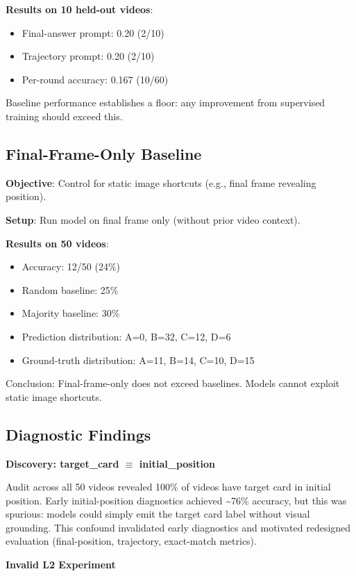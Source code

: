 \textbf{Results on 10 held-out videos}:
\begin{itemize}
    \item Final-answer prompt: 0.20 (2/10)
    \item Trajectory prompt: 0.20 (2/10)
    \item Per-round accuracy: 0.167 (10/60)
\end{itemize}

Baseline performance establishes a floor: any improvement from supervised training should exceed this.

\subsection{Final-Frame-Only Baseline}

\textbf{Objective}: Control for static image shortcuts (e.g., final frame revealing position).

\textbf{Setup}: Run model on final frame only (without prior video context).

\textbf{Results on 50 videos}:
\begin{itemize}
    \item Accuracy: 12/50 (24\%)
    \item Random baseline: 25\%
    \item Majority baseline: 30\%
    \item Prediction distribution: A=0, B=32, C=12, D=6
    \item Ground-truth distribution: A=11, B=14, C=10, D=15
\end{itemize}

Conclusion: Final-frame-only does not exceed baselines. Models cannot exploit static image shortcuts.

\subsection{Diagnostic Findings}

\textbf{Discovery: target\_card $\equiv$ initial\_position}

Audit across all 50 videos revealed 100\% of videos have target card in initial position. Early initial-position diagnostics achieved \textasciitilde76\% accuracy, but this was spurious: models could simply emit the target card label without visual grounding. This confound invalidated early diagnostics and motivated redesigned evaluation (final-position, trajectory, exact-match metrics).

\textbf{Invalid L2 Experiment}

